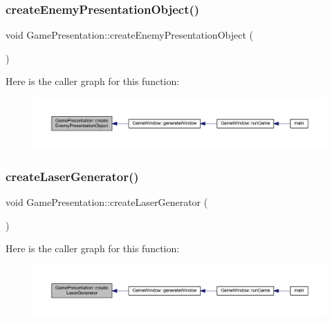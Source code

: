 \subsubsection{\texorpdfstring{create\+Enemy\+Presentation\+Object()}{createEnemyPresentationObject()}}
{\footnotesize\ttfamily void Game\+Presentation\+::create\+Enemy\+Presentation\+Object (\begin{DoxyParamCaption}{ }\end{DoxyParamCaption})}

Here is the caller graph for this function\+:\nopagebreak
\begin{figure}[H]
\begin{center}
\leavevmode
\includegraphics[width=350pt]{class_game_presentation_a59645176840f6ddec2673b9d447334d5_icgraph}
\end{center}
\end{figure}
\mbox{\label{class_game_presentation_ac20ace0966aacedc817bdafd6eb6f1ba}} 
\subsubsection{\texorpdfstring{create\+Laser\+Generator()}{createLaserGenerator()}}
{\footnotesize\ttfamily void Game\+Presentation\+::create\+Laser\+Generator (\begin{DoxyParamCaption}{ }\end{DoxyParamCaption})}

Here is the caller graph for this function\+:\nopagebreak
\begin{figure}[H]
\begin{center}
\leavevmode
\includegraphics[width=350pt]{class_game_presentation_ac20ace0966aacedc817bdafd6eb6f1ba_icgraph}
\end{center}
\end{figure}
\mbox{\label{class_game_presentation_ac87927887e1afc5583036efb01ab35ca}} 
